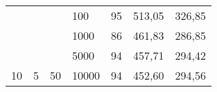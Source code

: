 \documentclass{article}
\begin{document}
\begin{table}[h]
\begin{tabular}{lllllll}
			&                                                &                                                                       &                                                                           &                                                                              &                                                                                     &                                                                                       \\ \hline
			\multicolumn{1}{|l|}{}                                                 & \multicolumn{1}{l|}{}                          & \multicolumn{1}{l|}{}                                                 & \multicolumn{1}{l|}{100}                                                  & \multicolumn{1}{l|}{95}                                                      & \multicolumn{1}{l|}{513,05}                                                         & \multicolumn{1}{l|}{326,85}                                                           \\ \cline{4-7} 
			\multicolumn{1}{|l|}{}                                                 & \multicolumn{1}{l|}{}                          & \multicolumn{1}{l|}{}                                                 & \multicolumn{1}{l|}{1000}                                                 & \multicolumn{1}{l|}{86}                                                      & \multicolumn{1}{l|}{461,83}                                                         & \multicolumn{1}{l|}{286,85}                                                           \\ \cline{4-7} 
			\multicolumn{1}{|l|}{}                                                 & \multicolumn{1}{l|}{}                          & \multicolumn{1}{l|}{}                                                 & \multicolumn{1}{l|}{5000}                                                 & \multicolumn{1}{l|}{94}                                                      & \multicolumn{1}{l|}{457,71}                                                         & \multicolumn{1}{l|}{294,42}                                                           \\ \cline{4-7} 
			\multicolumn{1}{|l|}{\multirow{-4}{*}{10}}                             & \multicolumn{1}{l|}{\multirow{-4}{*}{5}}       & \multicolumn{1}{l|}{\multirow{-4}{*}{50}}                             & \multicolumn{1}{l|}{10000}                                                & \multicolumn{1}{l|}{94}                                                      & \multicolumn{1}{l|}{452,60}                                                         & \multicolumn{1}{l|}{294,56}                                                           \\ \hline

\end{tabular}
\end{table}
\end{document}
